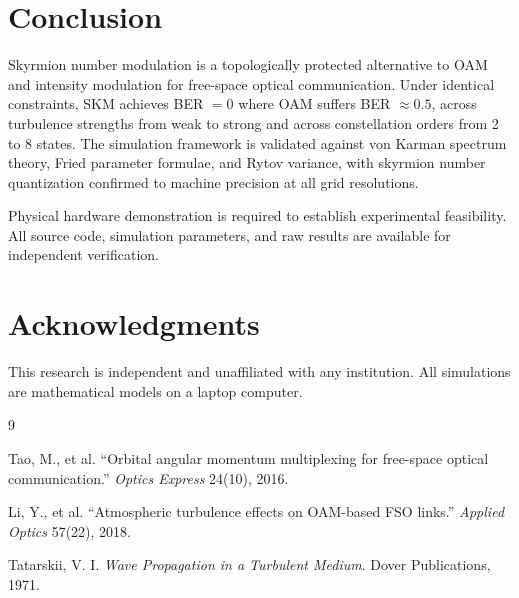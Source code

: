 \documentclass[11pt]{article}
\begin{document}
\section{Conclusion}

Skyrmion number modulation is a topologically protected alternative to OAM
and intensity modulation for free-space optical communication. Under
identical constraints, SKM achieves BER $=0$ where OAM suffers BER
$\approx 0.5$, across turbulence strengths from weak to strong and across
constellation orders from 2 to 8 states. The simulation framework is
validated against von Karman spectrum theory, Fried parameter formulae,
and Rytov variance, with skyrmion number quantization confirmed to machine
precision at all grid resolutions.

Physical hardware demonstration is required to establish experimental
feasibility. All source code, simulation parameters, and raw results are
available for independent verification.

\section*{Acknowledgments}

This research is independent and unaffiliated with any institution.
All simulations are mathematical models on a laptop computer.

\begin{thebibliography}{9}

Tao, M., et al. ``Orbital angular momentum multiplexing for free-space
optical communication.'' \emph{Optics Express} 24(10), 2016.

Li, Y., et al. ``Atmospheric turbulence effects on OAM-based FSO links.''
\emph{Applied Optics} 57(22), 2018.

Tatarskii, V. I. \emph{Wave Propagation in a Turbulent Medium}.
Dover Publications, 1971.

\end{thebibliography}
\end{document}
